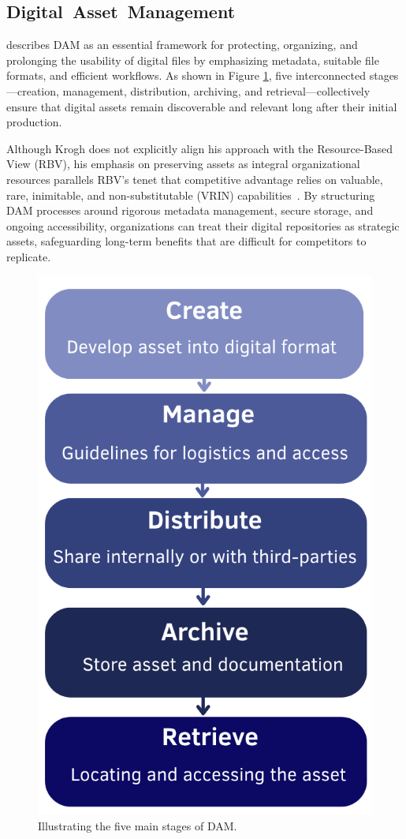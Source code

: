 \documentclass[a4paper,10pt,twocolumn]{article}
\numberwithin{figure}{section}
\numberwithin{table}{section}
\begin{document}

\subsection{\mbox{Digital Asset Management}}
\cite{krogh2009} describes DAM as an essential framework for protecting, 
organizing, and prolonging the usability of digital files by emphasizing 
metadata, suitable file formats, and efficient workflows. As shown in Figure \ref{fig:4steg}, 
five interconnected stages—creation, management, distribution, archiving, and retrieval—collectively 
ensure that digital assets remain discoverable and relevant long after their initial production.

Although Krogh does not explicitly align his approach with the Resource-Based View (RBV), 
his emphasis on preserving assets as integral organizational resources parallels RBV’s 
tenet that competitive advantage relies on valuable, rare, inimitable, and non-substitutable 
(VRIN) capabilities \citep{barney1991}. By structuring DAM processes around rigorous 
metadata management, secure storage, and ongoing accessibility, organizations can treat 
their digital repositories as strategic assets, safeguarding long-term benefits that are 
difficult for competitors to replicate.

\begin{figure}[htbp]
    \centering
    \includegraphics[width=0.5\linewidth]{4steg.png}  %
    \caption{Illustrating the five main stages of DAM.}
    \label{fig:4steg}  
\end{figure}
\end{document}
